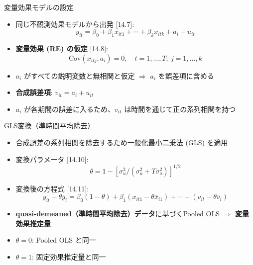 \documentclass[
  ignorenonframetext,
]{beamer}
\providecommand{\tightlist}{%
  \setlength{\itemsep}{0pt}\setlength{\parskip}{0pt}}
\begin{document}
\begin{frame}{変量効果モデルの設定}
\label{ux5909ux91cfux52b9ux679cux30e2ux30c7ux30ebux306eux8a2dux5b9a}
\begin{itemize}
\tightlist
\item
  同じ不観測効果モデルから出発 {[}14.7{]}:
  \[y_{it} = \beta_0 + \beta_1 x_{it1} + \cdots + \beta_k x_{itk} + a_i + u_{it}\]
\item
  \textbf{変量効果 (RE) の仮定} {[}14.8{]}:
  \[\text{Cov}(x_{itj}, a_i) = 0, \quad t = 1, \dots, T;\ j = 1, \dots, k\]
\item
  \(a_i\) がすべての説明変数と無相関と仮定 \(\Rightarrow\) \(a_i\)
  を誤差項に含める
\item
  \textbf{合成誤差項}: \(v_{it} = a_i + u_{it}\)
\item
  \(a_i\) が各期間の誤差に入るため、\(v_{it}\)
  は時間を通じて正の系列相関を持つ
\end{itemize}
\end{frame}

\begin{frame}{GLS変換（準時間平均除去）}
\label{glsux5909ux63dbux6e96ux6642ux9593ux5e73ux5747ux9664ux53bb}
\begin{itemize}
\tightlist
\item
  合成誤差の系列相関を除去するため一般化最小二乗法 (GLS) を適用
\item
  変換パラメータ {[}14.10{]}:
  \[\theta = 1 - \left[\sigma_u^2 / (\sigma_u^2 + T\sigma_a^2)\right]^{1/2}\]
\item
  変換後の方程式 {[}14.11{]}:
  \[y_{it} - \theta\bar{y}_i = \beta_0(1-\theta) + \beta_1(x_{it1} - \theta\bar{x}_{i1}) + \cdots + (v_{it} - \theta\bar{v}_i)\]
\item
  \textbf{quasi-demeaned（準時間平均除去）データ}に基づくPooled OLS
  \(\Rightarrow\) \textbf{変量効果推定量}
\item
  \(\theta = 0\): Pooled OLS と同一
\item
  \(\theta = 1\): 固定効果推定量と同一
\end{itemize}
\end{frame}
\end{document}
